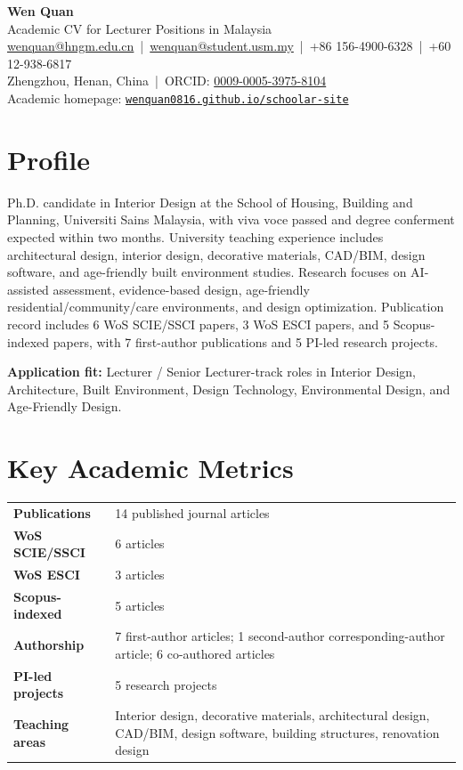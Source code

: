 \documentclass[11pt,a4paper]{article}
\begin{document}
{\LARGE \textbf{Wen Quan}}\\[-1pt]
\textcolor{subtle}{Academic CV for Lecturer Positions in Malaysia}\\[3pt]
\href{mailto:wenquan@hngm.edu.cn}{wenquan@hngm.edu.cn} \,|\, 
\href{mailto:wenquan@student.usm.my}{wenquan@student.usm.my} \,|\, 
+86 156-4900-6328 \,|\, +60 12-938-6817\\
Zhengzhou, Henan, China \,|\, ORCID: \href{https://orcid.org/0009-0005-3975-8104}{0009-0005-3975-8104}\\
Academic homepage: \href{https://wenquan0816.github.io/schoolar-site/}{\nolinkurl{wenquan0816.github.io/schoolar-site}}

\section*{Profile}
Ph.D. candidate in Interior Design at the School of Housing, Building and Planning, Universiti Sains Malaysia, with viva voce passed and degree conferment expected within two months. University teaching experience includes architectural design, interior design, decorative materials, CAD/BIM, design software, and age-friendly built environment studies. Research focuses on AI-assisted assessment, evidence-based design, age-friendly residential/community/care environments, and design optimization. Publication record includes 6 WoS SCIE/SSCI papers, 3 WoS ESCI papers, and 5 Scopus-indexed papers, with 7 first-author publications and 5 PI-led research projects.

\textbf{Application fit:} Lecturer / Senior Lecturer-track roles in Interior Design, Architecture, Built Environment, Design Technology, Environmental Design, and Age-Friendly Design.

\section*{Key Academic Metrics}
\begin{tabularx}{\textwidth}{>{\bfseries}p{}X}
Publications & 14 published journal articles \\
WoS SCIE/SSCI & 6 articles \\
WoS ESCI & 3 articles \\
Scopus-indexed & 5 articles \\
Authorship & 7 first-author articles; 1 second-author corresponding-author article; 6 co-authored articles \\
PI-led projects & 5 research projects \\
Teaching areas & Interior design, decorative materials, architectural design, CAD/BIM, design software, building structures, renovation design \\
\end{tabularx}
\end{document}
